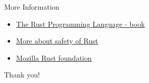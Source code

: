 \documentclass[10pt]{beamer}
\begin{document}
    \begin{frame}{More Information}
        \begin{itemize}
            \item \href{https://doc.rust-lang.org/book/}{The Rust Programming Language - book}
            \item \href{https://developer.okta.com/blog/2022/03/18/programming-security-and-why-rust}{More about safety of Rust}
            \item \href{https://blog.mozilla.org/en/mozilla/mozilla-welcomes-the-rust-foundation/}{Mozilla Rust foundation}
        \end{itemize}
    \end{frame}

    \begin{frame}
    \textcolor{myNewColorA}{\Huge{\centerline{Thank you!}}}
    \end{frame}
\end{document}
